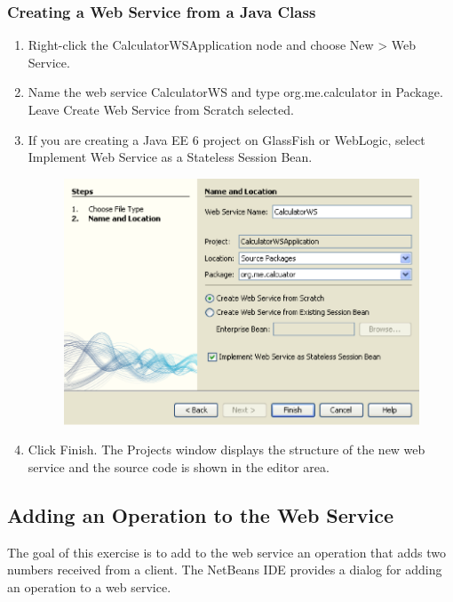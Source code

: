 \subsubsection{Creating a Web Service from a Java Class}
\begin{enumerate}
\item Right-click the CalculatorWSApplication node and choose New > Web Service.
\item Name the web service CalculatorWS and type org.me.calculator in Package. Leave Create Web Service from Scratch selected.
\item If you are creating a Java EE 6 project on GlassFish or WebLogic, select Implement Web Service as a Stateless Session Bean.

\begin{figure}
\begin{center}
\includegraphics[scale=1]{J1}
\label{J1}
\end{center}
\end{figure}

\item Click Finish. The Projects window displays the structure of the new web service and the source code is shown in the editor area.
\end{enumerate}

\subsection{Adding an Operation to the Web Service}
The goal of this exercise is to add to the web service an operation that adds two numbers received from a client. The NetBeans IDE provides a dialog for adding an operation to a web service. 
